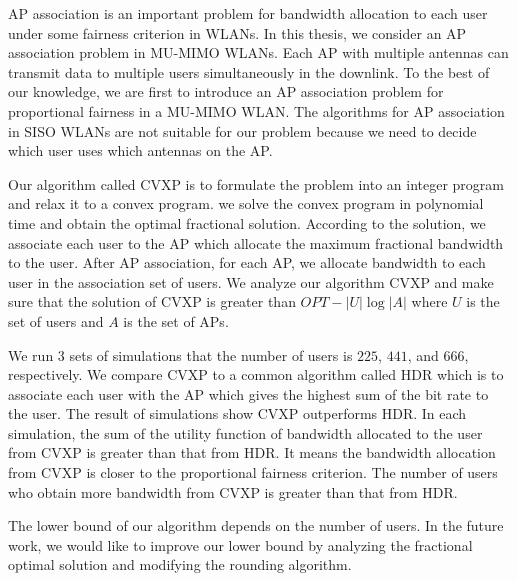 	AP association is an important problem for bandwidth allocation to each user under some fairness criterion in WLANs. In this thesis, we consider an AP association problem in MU-MIMO WLANs. Each AP with multiple antennas can transmit data to multiple users simultaneously in the downlink.
	To the best of our knowledge, we are first to introduce an AP association problem for proportional fairness in a MU-MIMO WLAN. The algorithms for AP association in SISO WLANs are not suitable for our problem because we need to decide which user uses which antennas on the AP. 
	
	Our algorithm called CVXP is to formulate the problem into an integer program and relax it to a convex program. we solve the convex program in polynomial time and obtain the optimal fractional solution. According to the solution, we associate each user to the AP which allocate the maximum fractional bandwidth to the user. After AP association, for each AP, we allocate bandwidth to each user in the association set of users. We analyze our algorithm CVXP and make sure that the solution of CVXP is greater than $OPT - |U|\log{|A|}$ where $U$ is the set of users and $A$ is the set of APs. 


	We run 3 sets of simulations that the number of users is $225$, $441$, and $666$, respectively. We compare CVXP to a common algorithm called HDR which is to associate each user with the AP which gives the highest sum of the bit rate to the user. The result of simulations show CVXP outperforms HDR. In each simulation, the sum of the utility function of bandwidth allocated to the user from CVXP is greater than that from HDR. It means the bandwidth allocation from CVXP is closer to the proportional fairness criterion. The number of users who obtain more bandwidth from CVXP is greater than that from HDR.
	
	The lower bound of our algorithm depends on the number of users. In the future work, we would like to improve our lower bound by analyzing the fractional optimal solution and modifying the rounding algorithm.